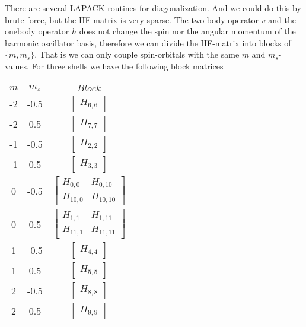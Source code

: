 There are several LAPACK routines for diagonalization. And we could do this by brute force, but the HF-matrix is very sparse. The two-body operator $v$ and the onebody operator $h$ does not change the spin nor the angular momentum of the harmonic oscillator basis, therefore we can divide the HF-matrix into blocks of $\{m,m_s\}$. That is we can only couple spin-orbitals with the same $m$ and $m_s$-values. For three shells we have the following block matrices

\begin{table}[H]
\begin{minipage}[b]{0.5\linewidth}\centering 
\begin{tabular}{ccc}
\toprule
$m$ & $m_s$ & $Block$\\
\midrule
-2	& -0.5 	 &  $\begin{bmatrix}H_{6,6}\end{bmatrix}$ \\
-2	& 0.5 	 &  $\begin{bmatrix}H_{7,7}\end{bmatrix}$ \\
-1	& -0.5 	 &  $\begin{bmatrix}H_{2,2}\end{bmatrix}$ \\
-1	& 0.5 	 &  $\begin{bmatrix}H_{3,3}\end{bmatrix}$ \\
0	& -0.5 	 &  $\begin{bmatrix}H_{0,0} & H_{0,10} \\ H_{10,0} & H_{10,10} \end{bmatrix}$ \\
0	& 0.5 	 &  $\begin{bmatrix}H_{1,1} & H_{1,11} \\ H_{11,1} & H_{11,11} \end{bmatrix}$ \\
1	& -0.5 	 &  $\begin{bmatrix}H_{4,4}\end{bmatrix}$ \\
1	& 0.5 	 &  $\begin{bmatrix}H_{5,5}\end{bmatrix}$ \\
2	& -0.5 	 &  $\begin{bmatrix}H_{8,8}\end{bmatrix}$ \\
2	& 0.5 	 &  $\begin{bmatrix}H_{9,9}\end{bmatrix}$ \\

\end{tabular}
\end{minipage}
\end{table}
